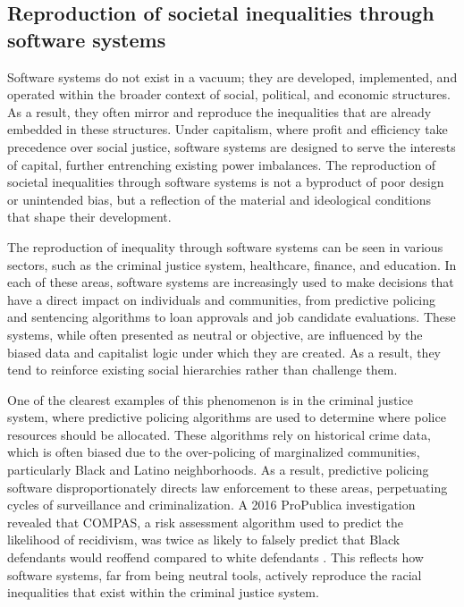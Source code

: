 \begin{refsection}
\subsection{Reproduction of societal inequalities through software systems}

Software systems do not exist in a vacuum; they are developed, implemented, and operated within the broader context of social, political, and economic structures. As a result, they often mirror and reproduce the inequalities that are already embedded in these structures. Under capitalism, where profit and efficiency take precedence over social justice, software systems are designed to serve the interests of capital, further entrenching existing power imbalances. The reproduction of societal inequalities through software systems is not a byproduct of poor design or unintended bias, but a reflection of the material and ideological conditions that shape their development.

The reproduction of inequality through software systems can be seen in various sectors, such as the criminal justice system, healthcare, finance, and education. In each of these areas, software systems are increasingly used to make decisions that have a direct impact on individuals and communities, from predictive policing and sentencing algorithms to loan approvals and job candidate evaluations. These systems, while often presented as neutral or objective, are influenced by the biased data and capitalist logic under which they are created. As a result, they tend to reinforce existing social hierarchies rather than challenge them.

One of the clearest examples of this phenomenon is in the criminal justice system, where predictive policing algorithms are used to determine where police resources should be allocated. These algorithms rely on historical crime data, which is often biased due to the over-policing of marginalized communities, particularly Black and Latino neighborhoods. As a result, predictive policing software disproportionately directs law enforcement to these areas, perpetuating cycles of surveillance and criminalization. A 2016 ProPublica investigation revealed that COMPAS, a risk assessment algorithm used to predict the likelihood of recidivism, was twice as likely to falsely predict that Black defendants would reoffend compared to white defendants \cite[pp.~14-16]{angwin2016}. This reflects how software systems, far from being neutral tools, actively reproduce the racial inequalities that exist within the criminal justice system.


\end{refsection}
